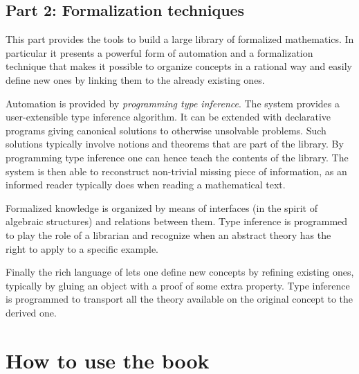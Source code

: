 \subsection*{Part 2: Formalization techniques}

This part provides the tools to build a large library of formalized
mathematics.  In particular it presents a powerful form of automation
and a formalization technique that makes it possible to organize
concepts in a rational way and easily define new ones by linking them
to the already existing ones.

Automation is provided by \emph{programming type inference}.
The \Coq{} system provides a user-extensible type inference
algorithm.  It can be extended with declarative programs
giving canonical solutions to otherwise unsolvable problems.
Such solutions typically involve notions and theorems that
are part of the \mcbMC{} library.  By programming type inference
one can hence teach \Coq{} the contents of the library.  The system
is then able to reconstruct non-trivial missing piece of information,
as an informed reader typically does when reading a mathematical text.

Formalized knowledge is organized by means of interfaces (in the spirit of
algebraic structures) and relations between them.  Type inference is programmed
to play the role of a librarian and recognize when an abstract theory has the
right to apply to a specific example.

Finally the rich language of \Coq{} lets one define new concepts
by refining existing ones, typically by gluing an object with
a proof of some extra property.  Type inference is programmed
to transport all the theory available on
the original concept to the derived one.



\section*{How to use the book}

